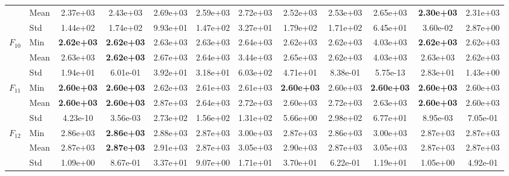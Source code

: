\begin{center}
\begin{longtable}{clcccccccccc}
 & Mean & 2.37e+03 & 2.43e+03 & 2.69e+03 & 2.59e+03 & 2.72e+03 & 2.52e+03 & 2.53e+03 & 2.65e+03 & \textbf{2.30e+03} & 2.31e+03 \\
 & Std & 1.44e+02 & 1.74e+02 & 9.93e+01 & 1.47e+02 & 3.27e+01 & 1.79e+02 & 1.71e+02 & 6.45e+01 & 3.60e-02 & 2.87e+00 \\
\midrule
\multirow{3}{*}{$F_{10}$} & Min & \textbf{2.62e+03} & \textbf{2.62e+03} & 2.63e+03 & 2.63e+03 & 2.64e+03 & 2.62e+03 & 2.62e+03 & 4.03e+03 & \textbf{2.62e+03} & 2.62e+03 \\
 & Mean & 2.63e+03 & \textbf{2.62e+03} & 2.67e+03 & 2.64e+03 & 3.44e+03 & 2.65e+03 & 2.62e+03 & 4.03e+03 & 2.63e+03 & 2.62e+03 \\
 & Std & 1.94e+01 & 6.01e-01 & 3.92e+01 & 3.18e+01 & 6.03e+02 & 4.71e+01 & 8.38e-01 & 5.75e-13 & 2.83e+01 & 1.43e+00 \\
\midrule
\multirow{3}{*}{$F_{11}$} & Min & \textbf{2.60e+03} & \textbf{2.60e+03} & 2.62e+03 & 2.61e+03 & 2.61e+03 & \textbf{2.60e+03} & 2.60e+03 & \textbf{2.60e+03} & \textbf{2.60e+03} & 2.60e+03 \\
 & Mean & \textbf{2.60e+03} & \textbf{2.60e+03} & 2.87e+03 & 2.64e+03 & 2.72e+03 & 2.60e+03 & 2.72e+03 & 2.63e+03 & \textbf{2.60e+03} & 2.60e+03 \\
 & Std & 4.23e-10 & 3.56e-03 & 2.73e+02 & 1.56e+02 & 1.31e+02 & 5.66e+00 & 2.98e+02 & 6.77e+01 & 8.95e-03 & 7.05e-01 \\
\midrule
\multirow{3}{*}{$F_{12}$} & Min & 2.86e+03 & \textbf{2.86e+03} & 2.88e+03 & 2.87e+03 & 3.00e+03 & 2.87e+03 & 2.86e+03 & 3.00e+03 & 2.87e+03 & 2.87e+03 \\
 & Mean & 2.87e+03 & \textbf{2.87e+03} & 2.91e+03 & 2.87e+03 & 3.05e+03 & 2.90e+03 & 2.87e+03 & 3.05e+03 & 2.87e+03 & 2.87e+03 \\
 & Std & 1.09e+00 & 8.67e-01 & 3.37e+01 & 9.07e+00 & 1.71e+01 & 3.70e+01 & 6.22e-01 & 1.19e+01 & 1.05e+00 & 4.92e-01 \\
\bottomrule
\end{longtable}
\end{center}